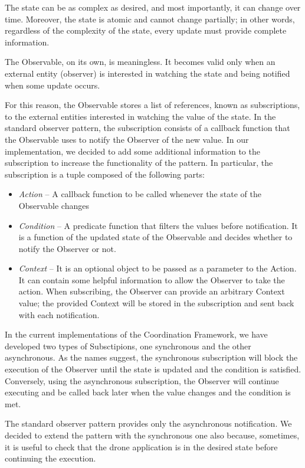 The state can be as complex as desired, and most importantly, it can change over time. 
Moreover, the state is atomic and cannot change partially; in other words, regardless of the complexity of the state, every update must provide complete information.

The Observable, on its own, is meaningless. 
It becomes valid only when an external entity (observer) is interested in watching the state and being notified when some update occurs.

For this reason, the Observable stores a list of references, known as subscriptions, to the external entities interested in watching the value of the state. 
In the standard observer pattern, the subscription consists of a callback function that the Observable uses to notify the Observer of the new value.
In our implementation, we decided to add some additional information to the subscription to increase the functionality of the pattern.
In particular, the subscription is a tuple composed of the following parts:
\begin{itemize}
    \item \textit{Action} -- A callback function to be called whenever the state of the Observable changes
    \item \textit{Condition} -- A predicate function that filters the values before notification. It is a function of the updated state of the Observable and decides whether to notify the Observer or not. 
    \item \textit{Context} --  It is an optional object to be passed as a parameter to the Action. It can contain some helpful information to allow the Observer to take the action. 
    When subscribing, the Observer can provide an arbitrary Context value; the provided Context will be stored in the subscription and sent back with each notification.
\end{itemize}

In the current implementations of the Coordination Framework, we have developed two types of Subsctipions, one synchronous and the other asynchronous. 
As the names suggest, the synchronous subscription will block the execution of the Observer until the state is updated and the condition is satisfied.
Conversely, using the asynchronous subscription, the Observer will continue executing and be called back later when the value changes and the condition is met.

The standard observer pattern provides only the asynchronous notification. 
We decided to extend the pattern with the synchronous one also because, sometimes, it is useful to check that the drone application is in the desired state before continuing the execution.

